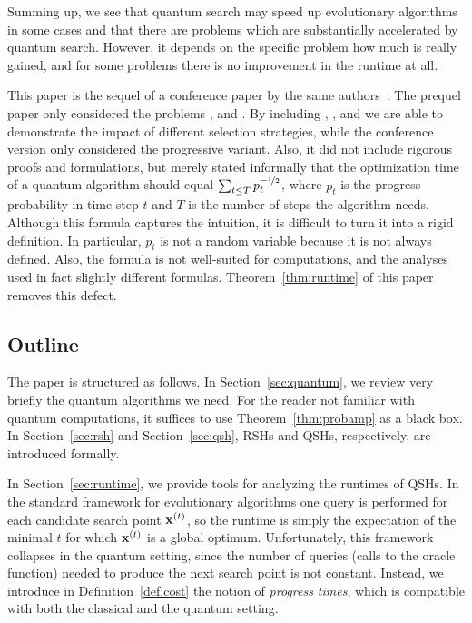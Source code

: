 \documentclass[a4paper,11pt]{article}
\begin{document}
Summing up, we see that quantum search may speed up evolutionary algorithms in some cases and that there are problems which are substantially accelerated by quantum search. However, it depends on the specific problem how much is really gained, and for some problems there is no improvement in the runtime at all. 

This paper is the sequel of a conference paper by the same authors~\cite{JKL10}. The prequel paper only considered the problems \onemax, \discrepancy and \leadingones. By including \needle, \jumpm, and \tinytrap we are able to demonstrate the impact of different selection strategies, while the conference version only considered the progressive variant. Also, it did not include rigorous proofs and formulations, but merely stated informally that the optimization time of a quantum algorithm should equal $\sum_{t\leq T} p_t^{-\nicefrac{1}{2}}$, where $p_t$ is the progress probability in time step $t$ and $T$ is the number of steps the algorithm needs. Although this formula captures the intuition, it is difficult to turn it into a rigid definition. In particular, $p_t$ is not a random variable because it is not always defined. Also, the formula is not well-suited for computations, and the analyses used in fact slightly different formulas. Theorem~\ref{thm:runtime} of this paper removes this defect.

\subsection{Outline}
The paper is structured as follows. In Section~\ref{sec:quantum}, we review very briefly the quantum algorithms we need. For the reader not familiar with quantum computations, it suffices to use Theorem~\ref{thm:probamp} as a black box. In Section~\ref{sec:rsh} and Section~\ref{sec:qsh}, RSHs and QSHs, respectively, are introduced formally.

In Section~\ref{sec:runtime}, we provide tools for analyzing the runtimes of QSHs. In the standard framework for evolutionary algorithms one query is performed for each candidate search point $\xvec[t]$, so the runtime is simply the expectation of the minimal $t$ for which $\xvec[t]$ is a global optimum. Unfortunately, this framework collapses in the quantum setting, since the number of queries (calls to the oracle function) needed to produce the next search point is not constant. Instead, we introduce in Definition~\ref{def:cost} the notion of \emph{progress times}, which is compatible with both the classical and the quantum setting.
\end{document}
